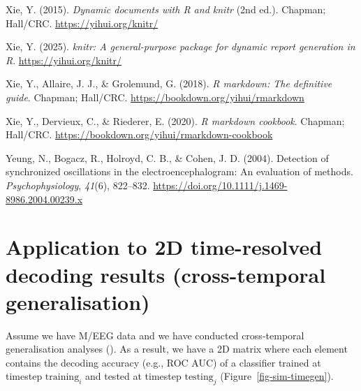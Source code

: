 \documentclass[
  doc,
  floatsintext,
  longtable,
  a4paper,
  nolmodern,
  notxfonts,
  notimes,
  colorlinks=true,linkcolor=blue,citecolor=blue,urlcolor=blue]{apa7}
\newlength{\cslhangindent}
\newenvironment{CSLReferences}[2] %
 {\begin{list}{}{%
  \setlength{\itemindent}{0pt}
  \setlength{\leftmargin}{0pt}
  \setlength{\parsep}{0pt}
  \ifodd #1
   \setlength{\leftmargin}{\cslhangindent}
   \setlength{\itemindent}{-1\cslhangindent}
  \fi
  \setlength{\itemsep}{#2\baselineskip}}}
 {\end{list}}
\begin{document}
\begin{CSLReferences}{1}{0}
Xie, Y. (2015). \emph{Dynamic documents with {R} and knitr} (2nd ed.).
Chapman; Hall/CRC. \url{https://yihui.org/knitr/}

Xie, Y. (2025). \emph{{knitr}: A general-purpose package for dynamic
report generation in {R}}. \url{https://yihui.org/knitr/}

Xie, Y., Allaire, J. J., \& Grolemund, G. (2018). \emph{R markdown: The
definitive guide}. Chapman; Hall/CRC.
\url{https://bookdown.org/yihui/rmarkdown}

Xie, Y., Dervieux, C., \& Riederer, E. (2020). \emph{R markdown
cookbook}. Chapman; Hall/CRC.
\url{https://bookdown.org/yihui/rmarkdown-cookbook}

Yeung, N., Bogacz, R., Holroyd, C. B., \& Cohen, J. D. (2004). Detection
of synchronized oscillations in the electroencephalogram: An evaluation
of methods. \emph{Psychophysiology}, \emph{41}(6), 822--832.
\url{https://doi.org/10.1111/j.1469-8986.2004.00239.x}

\end{CSLReferences}

\newpage

\appendix

\section{Application to 2D time-resolved decoding results
(cross-temporal
generalisation)}\label{application-to-2d-time-resolved-decoding-results-cross-temporal-generalisation}

Assume we have M/EEG data and we have conducted cross-temporal
generalisation analyses (). As a result, we have a 2D matrix where each element contains the
decoding accuracy (e.g., ROC AUC) of a classifier trained at timestep
\(\text{training}_{i}\) and tested at timestep \(\text{testing}_{j}\)
(Figure~\ref{fig-sim-timegen}).
\end{document}

